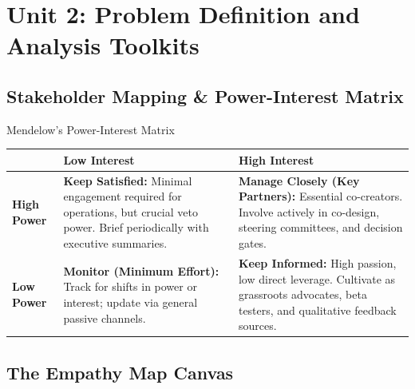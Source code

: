 \chapter{Unit 2: Problem Definition and Analysis Toolkits}
\label{chap:unit2-canvases}

\section{Stakeholder Mapping \& Power-Interest Matrix}

\begin{canvasbox}{Mendelow's Power-Interest Matrix}
\begin{tabularx}{\linewidth}{|l|X|X|} \hline
 & \textbf{Low Interest} & \textbf{High Interest} \\ \hline
\textbf{High Power} & \textbf{Keep Satisfied:} Minimal engagement required for operations, but crucial veto power. Brief periodically with executive summaries. & \textbf{Manage Closely (Key Partners):} Essential co-creators. Involve actively in co-design, steering committees, and decision gates. \\ \hline
\textbf{Low Power} & \textbf{Monitor (Minimum Effort):} Track for shifts in power or interest; update via general passive channels. & \textbf{Keep Informed:} High passion, low direct leverage. Cultivate as grassroots advocates, beta testers, and qualitative feedback sources. \\ \hline
\end{tabularx}
\end{canvasbox}

\section{The Empathy Map Canvas}

